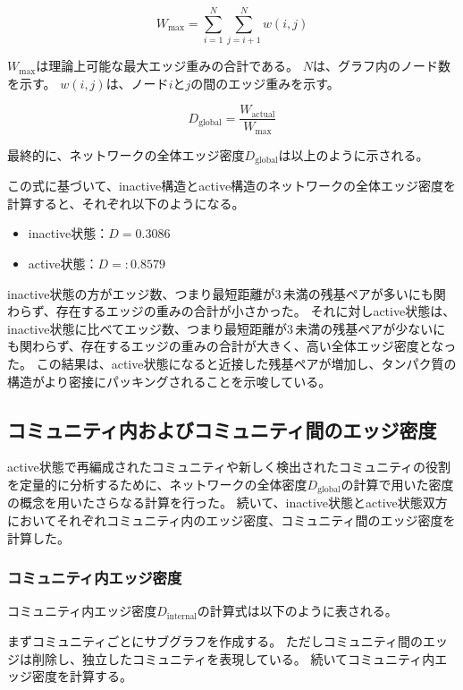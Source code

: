 \begin{equation}
W_{\text{max}} = \sum_{i=1}^{N} \sum_{j=i+1}^{N} w(i, j)
\end{equation}

$W_{\text{max}}$は理論上可能な最大エッジ重みの合計である。
$N$は、グラフ内のノード数を示す。
$w(i, j)$は、ノード$i$と$j$の間のエッジ重みを示す。

\begin{equation}
D_{\text{global}} = \frac{W_{\text{actual}}}{W_{\text{max}}}
\label{eq:global_density}
\end{equation}

最終的に、ネットワークの全体エッジ密度$D_{\text{global}}$は以上のように示される。

この式に基づいて、inactive構造とactive構造のネットワークの全体エッジ密度を計算すると、それぞれ以下のようになる。
\begin{itemize}
    \item inactive状態：\( D = 0.3086 \)
    \item active状態：\( D = :0.8579 \)
\end{itemize}

inactive状態の方がエッジ数、つまり最短距離が3\,\text{\AA}未満の残基ペアが多いにも関わらず、存在するエッジの重みの合計が小さかった。
それに対しactive状態は、inactive状態に比べてエッジ数、つまり最短距離が3\,\text{\AA}未満の残基ペアが少ないにも関わらず、存在するエッジの重みの合計が大きく、高い全体エッジ密度となった。
この結果は、active状態になると近接した残基ペアが増加し、タンパク質の構造がより密接にパッキングされることを示唆している。

\subsection{コミュニティ内およびコミュニティ間のエッジ密度}
active状態で再編成されたコミュニティや新しく検出されたコミュニティの役割を定量的に分析するために、ネットワークの全体密度$D_{\text{global}}$の計算で用いた密度の概念を用いたさらなる計算を行った。
続いて、inactive状態とactive状態双方においてそれぞれコミュニティ内のエッジ密度、コミュニティ間のエッジ密度を計算した。

\subsubsection{コミュニティ内エッジ密度}
コミュニティ内エッジ密度$D_{\text{internal}}$の計算式は以下のように表される。

まずコミュニティごとにサブグラフを作成する。
ただしコミュニティ間のエッジは削除し、独立したコミュニティを表現している。
続いてコミュニティ内エッジ密度を計算する。

